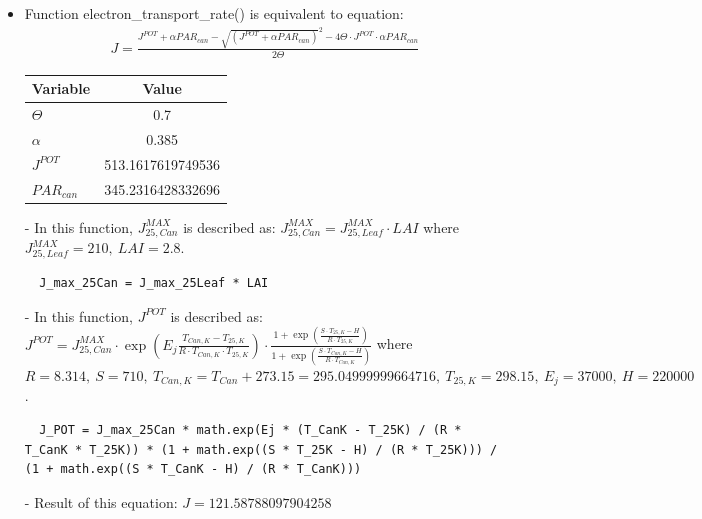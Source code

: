 \documentclass[a4paper]{article}
\numberwithin{equation}{section}
\begin{document}
\begin{itemize}
  \item Function electron\_transport\_rate() is equivalent to equation:
        \begin{align*}
          J = \frac{J^{POT} + \alpha PAR_{can} - {\sqrt{(J^{POT} + \alpha PAR_{can})}^2 - 4\Theta\cdot J^{POT}\cdot \alpha PAR_{can}}}{2 \Theta}
        \end{align*}

        \begin{table}[H]
          \centering
          \begin{tabular}{@{}lS[table-format=3.13]@{}}
            \toprule
            \textbf{Variable} & \textbf{Value}    \\
            \midrule
            \(\Theta\)        & 0.7               \\
            \(\alpha\)        & 0.385             \\
            \(J^{POT}\)       & 513.1617619749536 \\
            \(PAR_{can}\)     & 345.2316428332696 \\
            \bottomrule
          \end{tabular}
        \end{table}

  \item[-] In this function, \(J^{MAX}_{25,Can}\) is described as: \(J^{MAX}_{25,Can} = J^{MAX}_{25,Leaf} \cdot LAI\) where \(J^{MAX}_{25,Leaf} = 210,\ LAI = 2.8\).
        \begin{mdframed}[leftline=false,rightline=false,backgroundcolor=magenta!10,nobreak=true]
          \begin{verbatim}
  J_max_25Can = J_max_25Leaf * LAI
          \end{verbatim}
        \end{mdframed}
  \item[-] In this function, \(J^{POT}\) is described as: \(J^{POT} = J^{MAX}_{25,Can} \cdot \exp \left(E_j\frac{T_{Can,K}-T_{25,K}}{R\cdot T_{Can,K}\cdot T_{25,K}}\right) \cdot \frac{1 + \exp \left(\frac{S\cdot T_{25,K}-H}{R\cdot T_{25,K}}\right)}{1 + \exp \left(\frac{S\cdot T_{Can,K}-H}{R\cdot T_{Can,K}}\right)}\) where \(R = 8.314,\ S = 710,\ T_{Can,K} = T_{Can} + 273.15 = 295.04999999664716,\ T_{25,K} = 298.15,\ E_j = 37000,\ H = 220000\).
        \begin{mdframed}[leftline=false,rightline=false,backgroundcolor=magenta!10,nobreak=true]
          \begin{verbatim}
  J_POT = J_max_25Can * math.exp(Ej * (T_CanK - T_25K) / (R * T_CanK * T_25K)) * (1 + math.exp((S * T_25K - H) / (R * T_25K))) / (1 + math.exp((S * T_CanK - H) / (R * T_CanK)))
          \end{verbatim}
        \end{mdframed}
  \item[-] Result of this equation: \(J = 121.58788097904258\)


\end{itemize}
\end{document}
